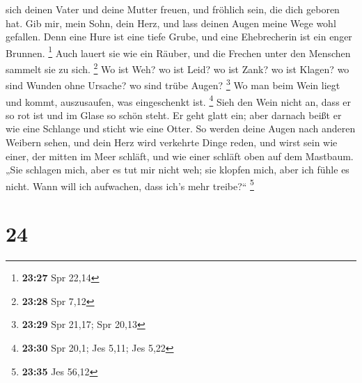 sich deinen Vater und deine Mutter freuen, und fröhlich sein, die dich
geboren hat.  Gib mir, mein Sohn, dein Herz, und lass
deinen Augen meine Wege wohl gefallen.  Denn eine Hure ist
eine tiefe Grube, und eine Ehebrecherin ist ein enger Brunnen.
\footnote{\textbf{23:27} Spr 22,14}  Auch lauert sie wie
ein Räuber, und die Frechen unter den Menschen sammelt sie zu sich.
\footnote{\textbf{23:28} Spr 7,12}  Wo ist Weh? wo ist
Leid? wo ist Zank? wo ist Klagen? wo sind Wunden ohne Ursache? wo sind
trübe Augen? \footnote{\textbf{23:29} Spr 21,17; Spr 20,13}
 Wo man beim Wein liegt und kommt, auszusaufen, was
eingeschenkt ist. \footnote{\textbf{23:30} Spr 20,1; Jes 5,11; Jes 5,22}
 Sieh den Wein nicht an, dass er so rot ist und im Glase so
schön steht. Er geht glatt ein;  aber darnach beißt er wie
eine Schlange und sticht wie eine Otter.  So werden deine
Augen nach anderen Weibern sehen, und dein Herz wird verkehrte Dinge
reden,  und wirst sein wie einer, der mitten im Meer
schläft, und wie einer schläft oben auf dem Mastbaum.  „Sie
schlagen mich, aber es tut mir nicht weh; sie klopfen mich, aber ich
fühle es nicht. Wann will ich aufwachen, dass ich's mehr treibe?{}``
\footnote{\textbf{23:35} Jes 56,12}

\hypertarget{section-11}{%
\section{24}\label{section-11}}

